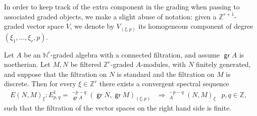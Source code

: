 \documentclass[11pt,fleqn]{article}
\newcommand\NN{\mathbb N}
\newcommand\ZZ{\mathbb Z}
\DeclareMathOperator\GrExt{\underline{\mathsf{Ext}}}
\DeclareMathOperator\gr{\mathsf{gr}}
\begin{document}
In order to keep track of the extra component in the grading when passing to 
associated graded objects, we make a slight abuse of notation: given a 
$\ZZ^{r+1}$-graded vector space $V$, we denote by $V_{(\xi, p)}$ its 
homogeneous component of degree $(\xi_1, \ldots, \xi_r, p)$.

\begin{Proposition*} 
Let $A$ be an $\NN^r$-graded algebra with a connected filtration, and 
assume $\gr A$ is noetherian. Let $M, N$ be filtered $\ZZ^r$-graded 
$A$-modules, with $N$ finitely generated, and suppose that the filtration on 
$N$ is standard and the filtration on $M$ is discrete. Then
for every $\xi \in \ZZ^r$ there exists a convergent spectral sequence
\begin{align*} 
  E(N,M)_\xi: E_{p,q}^1 = \GrExt_{\gr A}^{-p-q}(\gr N, \gr M)_{(\xi,p)}
    &\Rightarrow \GrExt_A^{-p-q}(N,M)_\xi 
    &p,q \in \ZZ, 
\end{align*} 
such that the filtration of the vector spaces on the right hand side is finite.
\end{Proposition*}
\end{document}
